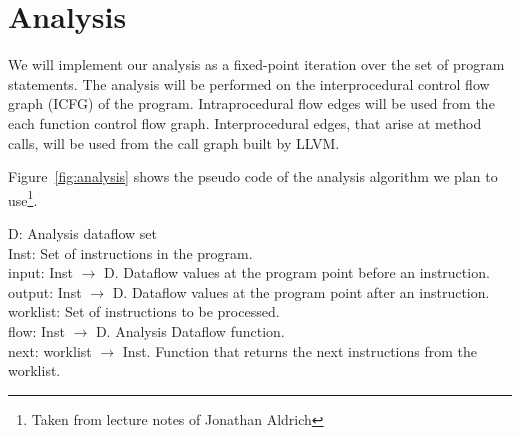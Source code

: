 \section{Analysis}\label{analysis}

We will implement our analysis as a fixed-point iteration
over the set of program statements. The analysis will be
performed on the interprocedural control flow graph (ICFG) of
the program. Intraprocedural flow edges will be used from
the each function control flow graph. Interprocedural edges,
that arise at method calls, will be used from the call graph
built by LLVM.  

Figure~\ref{fig:analysis} shows the pseudo code of the
analysis algorithm we plan to use\footnote{Taken from
lecture notes of Jonathan Aldrich}.

D: Analysis dataflow set\\
Inst: Set of instructions in the program.\\
input: Inst $\rightarrow$ D. Dataflow values at the
program point before an instruction.\\
output: Inst $\rightarrow$ D. Dataflow values at the
program point after an instruction.\\
worklist: Set of instructions to be processed.\\
flow: Inst $\rightarrow$ D. Analysis Dataflow function.\\
next: worklist $\rightarrow$ Inst. Function that returns the
next instructions from the worklist.\\

\begin{comment}
\begin{figure}[!h]
\begin{algorithmic}[1]
\ForAll{$i \in Inst$}
	\State $input[i] = \bot$
\EndFor

\State ANALYZE($initDataFlow$)
\end{algorithmic}
\caption{Interprocedural dataflow analysis algorithm}
\label{fig:analysis}
\end{figure}

\begin{figure}[!h]
\begin{algorithmic}[1]
\Function{Analyze}{$f: Procedure,\ initDataFlow: D$}
	\State $input[first(f)] = initDataflow$
	\State $worklist = \set{ first(f) }$
	\While{ $worklist\ != \emptyset$ }
    	\State $i = next(worklist)$
	    \State $output[i] = FLOW(i, input[i])$
    	\ForAll{$j \in succs(i)$} 
			\If{ $output[i] \not\sqsubseteq input[j]$}
				\State $input[j] = input[j] \sqcup output[i]$
				\State $worklist = worklist \cup\ \set{j}$
			\EndIf
	    \EndFor
	\EndWhile
\EndFunction
\end{algorithmic}
\caption{Interprocedural dataflow analysis algorithm}
\label{fig:algoAnalyze}
\end{figure}
\end{comment}

